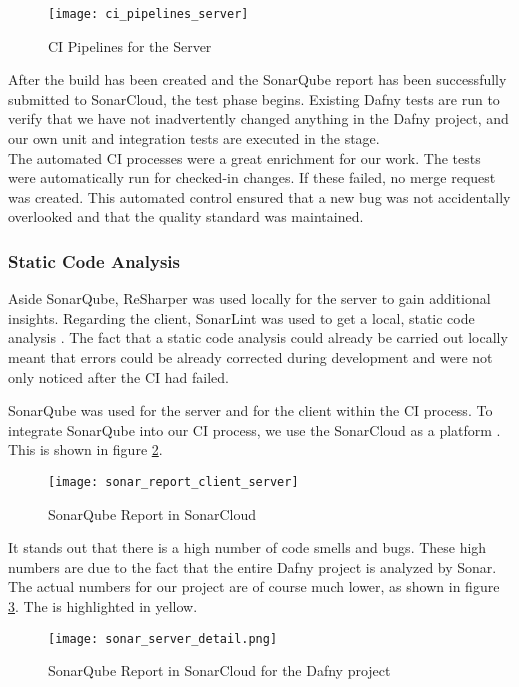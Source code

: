 \begin{figure}[H]
    \centering
    \texttt{[image: ci\_pipelines\_server]}
    \caption{CI Pipelines for the Server}
    \label{fig:ci_server}
\end{figure}

After the build has been created and the SonarQube report has been successfully submitted to SonarCloud,
the test phase begins.
Existing Dafny tests are run to verify
that we have not inadvertently changed anything in the Dafny project,
and our own unit and integration tests are executed in the  stage. \\

The automated CI processes were a great enrichment for our work.
The tests were automatically run for checked-in changes.
If these failed, no merge request was created.
This automated control ensured that a new bug was not accidentally overlooked
and that the quality standard was maintained.

\subsubsection{Static Code Analysis}
Aside SonarQube, ReSharper was used locally for the server to gain additional insights.
Regarding the client, SonarLint was used to get a local, static code analysis \cite{sonar-lint}.
The fact that a static code analysis could already be carried out locally meant that errors
could be already corrected during development and were not only noticed after the CI had failed.

SonarQube was used for the server and for the client within the CI process.
To integrate SonarQube into our CI process, we use the SonarCloud as a platform \cite{sonarcloud}.
This is shown in figure \ref{fig:sonarcloud_report}.


\begin{figure}[H]
    \centering
    \texttt{[image: sonar\_report\_client\_server]}
    \caption{SonarQube Report in SonarCloud}
    \label{fig:sonarcloud_report}
\end{figure}

It stands out that there is a high number of code smells and bugs.
These high numbers are due to the fact that the entire Dafny project is analyzed by Sonar.
The actual numbers for our project are of course much lower,
as shown in figure \ref{fig:sonar_server_detail}.
The  is highlighted in yellow.

\begin{figure}[H]
    \centering
    \texttt{[image: sonar\_server\_detail.png]}
    \caption{SonarQube Report in SonarCloud for the Dafny project}
    \label{fig:sonar_server_detail}
\end{figure}

